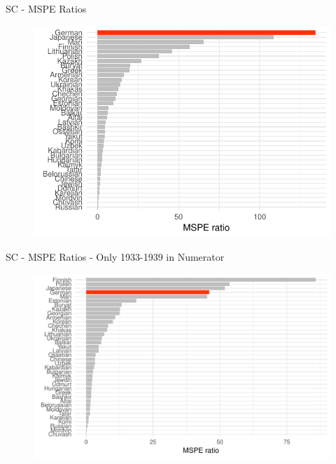 \documentclass[11pt]{beamer}
\begin{document}
\begin{frame}{SC - MSPE Ratios}
 \begin{figure}[h]
\centering
\includegraphics[width=1\textwidth]{mspe_ratios_imp_date.pdf}
\label{fig:mspe_ratios_imp_date}
\end{figure}
\end{frame}



\begin{frame}{SC - MSPE Ratios - Only 1933-1939 in Numerator}
 \begin{figure}[h]
\centering
\includegraphics[width=1\textwidth]{mspe_ratios_imp_date_until_1939.pdf}
\label{fig:mspe_ratios_imp_date_until_1939}
\end{figure}
\end{frame}
\end{document}
